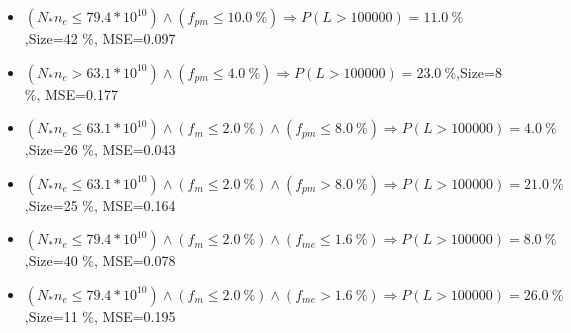 \documentclass[numbered]{CSL}
\begin{document}
\begin{itemize}
\item $(N_* n_e \leq 79.4 * 10^{10}) \land (f_{pm} \leq 10.0~\%) \Rightarrow P(L > 100 000) = 11.0~\%$,\hfill Size=42 \%, MSE=0.097
\item $(N_* n_e > 63.1 * 10^{10}) \land (f_{pm} \leq 4.0~\%) \Rightarrow P(L > 100 000) = 23.0~\%$,\hfill Size=8 \%, MSE=0.177
\item $(N_* n_e \leq 63.1 * 10^{10}) \land (f_m \leq 2.0~\%) \land (f_{pm} \leq 8.0~\%) \Rightarrow P(L > 100 000) = 4.0~\%$,\hfill Size=26 \%, MSE=0.043
\item $(N_* n_e \leq 63.1 * 10^{10}) \land (f_m \leq 2.0~\%) \land (f_{pm} > 8.0~\%) \Rightarrow P(L > 100 000) = 21.0~\%$,\hfill Size=25 \%, MSE=0.164
\item $(N_* n_e \leq 79.4 * 10^{10}) \land (f_m \leq 2.0~\%) \land (f_{me} \leq 1.6~\%) \Rightarrow P(L > 100 000) = 8.0~\%$,\hfill Size=40 \%, MSE=0.078
\item $(N_* n_e \leq 79.4 * 10^{10}) \land (f_m \leq 2.0~\%) \land (f_{me} > 1.6~\%) \Rightarrow P(L > 100 000) = 26.0~\%$,\hfill Size=11 \%, MSE=0.195
\end{itemize}
\end{document}
